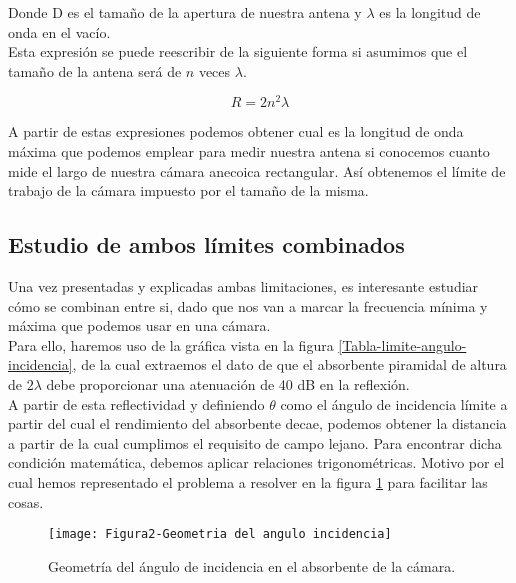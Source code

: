 Donde D es el tamaño de la apertura de nuestra antena y ${\lambda}$ es la longitud de onda en el vacío.\\
Esta expresión se puede reescribir de la siguiente forma si asumimos que el tamaño de la antena será de $n$ veces ${\lambda}$.

                            \begin{equation}
                            R =2n^2\lambda
                            \end{equation}

A partir de estas expresiones podemos obtener cual es la longitud de onda máxima que podemos emplear para medir nuestra antena si conocemos cuanto mide el largo de nuestra cámara anecoica rectangular. Así obtenemos el límite de trabajo de la cámara impuesto por el tamaño de la misma. 

\newpage

\subsection{Estudio de ambos límites combinados}

Una vez presentadas y explicadas ambas limitaciones, es interesante estudiar cómo se combinan entre si, dado que nos van a marcar la frecuencia mínima y máxima que podemos usar en una cámara. 
\\

Para ello, haremos uso de la gráfica vista en la figura \ref{Tabla-limite-angulo-incidencia}, de la cual extraemos el dato de que el absorbente piramidal de altura de $2\lambda$ debe proporcionar una atenuación de 40 dB en la reflexión. 
\\

A partir de esta reflectividad y definiendo $\theta$ como el ángulo de incidencia límite a partir del cual el rendimiento del absorbente decae, podemos obtener la distancia a partir de la cual cumplimos el requisito de campo lejano. Para encontrar dicha condición matemática, debemos aplicar relaciones trigonométricas. Motivo por el cual hemos representado el problema a resolver en la figura \ref{Geometría-del-ángulo-incidencia-absorvente} para facilitar las cosas. 

\begin{figure}[h]
    \centering
    \texttt{[image: Figura2-Geometria del angulo incidencia]}
    \caption{Geometría del ángulo de incidencia en el absorbente de la cámara.}
    \label{Geometría-del-ángulo-incidencia-absorvente}
\end{figure}



